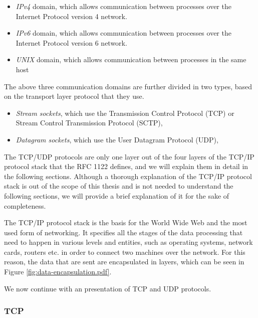 \begin{itemize}
	\item \textit{IPv4} domain, which allows communication between 
		processes over the Internet Protocol version 4 network.
	\item \textit{IPv6} domain, which allows communication between 
		processes over the Internet Protocol version 6 network.
	\item \textit{UNIX} domain, which allows communication between 
		processes in the same host
\end{itemize}

The above three communication domains are further divided in two types, based 
on the transport layer protocol that they use.

\begin{itemize}
	\item \textit{Stream sockets}, which use the Transmission Control 
		Protocol (TCP) or Stream Control Transmission Protocol (SCTP),
	\item \textit{Datagram sockets}, which use the User Datagram Protocol 
		(UDP),
\end{itemize}

The TCP/UDP protocols are only one layer out of the four layers of the TCP/IP 
protocol stack that the RFC 1122\cite{1122} defines, and we will explain them 
in detail in the following sections.  Although a thorough explanation of the 
TCP/IP protocol stack is out of the scope of this thesis and is not needed to 
understand the following sections, we will provide a brief explanation of it 
for the sake of completeness.  

The TCP/IP protocol stack is the basis for the World Wide Web and the most used 
form of networking. It specifies all the stages of the data processing that 
need to happen in various levels and entities, such as operating systems, 
network cards, routers etc. in order to connect two machines over the network.  
For this reason, the data that are sent are encapsulated in layers, which can 
be seen in Figure \ref{fig:data-encapsulation.pdf}.


We now continue with an presentation of TCP and UDP protocols.

\subsubsection{TCP}

